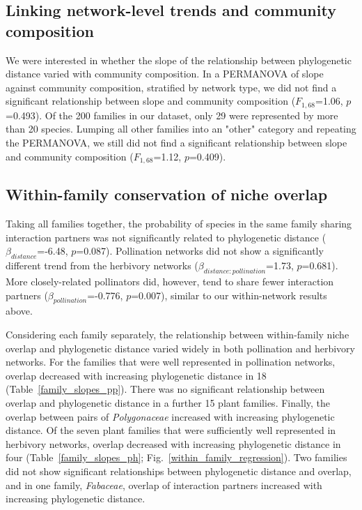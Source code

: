 \documentclass[12pt]{article}
\begin{document}
\begin{spacing}{1.5}
   


  \subsection*{Linking network-level trends and community composition} 

    We were interested in whether the slope of the relationship between phylogenetic distance varied with community composition. In a PERMANOVA of slope against community composition, stratified by network type, we did not find a significant relationship between slope and community composition ($F_{1,68}$=1.06, $p$=0.493). Of the 200 families in our dataset, only 29 were represented by more than 20 species. Lumping all other families into an "other" category and repeating the PERMANOVA, we still did not find a significant relationship between slope and community composition ($F_{1,68}$=1.12, $p$=0.409). 


  \subsection*{Within-family conservation of niche overlap} 

    Taking all families together, the probability of species in the same family sharing interaction partners was not significantly related to phylogenetic distance ($\beta_{distance}$=-6.48, $p$=0.087). Pollination networks did not show a significantly different trend from the herbivory networks ($\beta_{distance:pollination}$=1.73, $p$=0.681). More closely-related pollinators did, however, tend to share fewer interaction partners ($\beta_{pollination}$=-0.776, $p$=0.007), similar to our within-network results above.


    Considering each family separately, the relationship between within-family niche overlap and phylogenetic distance varied widely in both pollination and herbivory networks. 
    For the families
    that were well represented in pollination networks, overlap decreased
    with increasing phylogenetic distance in 18 (Table~\ref{family_slopes_pp}).
    There was no significant relationship between overlap and phylogenetic distance in
    a further 15 plant families. Finally, the overlap between pairs of \emph{Polygonaceae}
    increased with increasing phylogenetic distance. 
    Of the seven plant families that were sufficiently well represented in herbivory 
    networks, overlap decreased with increasing phylogenetic distance in four 
    (Table~\ref{family_slopes_ph}; Fig.~\ref{within_family_regression}). Two
    families did not show significant relationships between phylogenetic distance and overlap,
    and in one family, \emph{Fabaceae}, overlap of interaction partners increased with 
    increasing phylogenetic distance.



\end{spacing}
\end{document}
